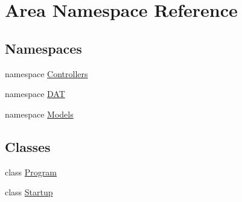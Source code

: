 \hypertarget{namespaceArea}{}\section{Area Namespace Reference}
\label{namespaceArea}
\subsection*{Namespaces}
\begin{DoxyCompactItemize}
\item 
namespace \mbox{\hyperlink{namespaceArea_1_1Controllers}{Controllers}}
\item 
namespace \mbox{\hyperlink{namespaceArea_1_1DAT}{D\+AT}}
\item 
namespace \mbox{\hyperlink{namespaceArea_1_1Models}{Models}}
\end{DoxyCompactItemize}
\subsection*{Classes}
\begin{DoxyCompactItemize}
\item 
class \mbox{\hyperlink{classArea_1_1Program}{Program}}
\item 
class \mbox{\hyperlink{classArea_1_1Startup}{Startup}}
\end{DoxyCompactItemize}
